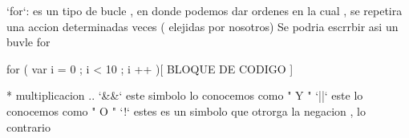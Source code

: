 `for`:   es un tipo de bucle , en donde podemos dar ordenes en la cual ,
         se repetira una accion determinadas veces ( elejidas por nosotros)
         Se podria escrrbir asi un buvle for 

         for ( var i = 0 ; i < 10 ; i ++ )[
            BLOQUE DE CODIGO 
         ]

* multiplicacion ..
`&&` este simbolo lo conocemos como " Y " 
`||` este lo conocemos como "  O "
`!` estes es un simbolo que otrorga la negacion , lo contrario 